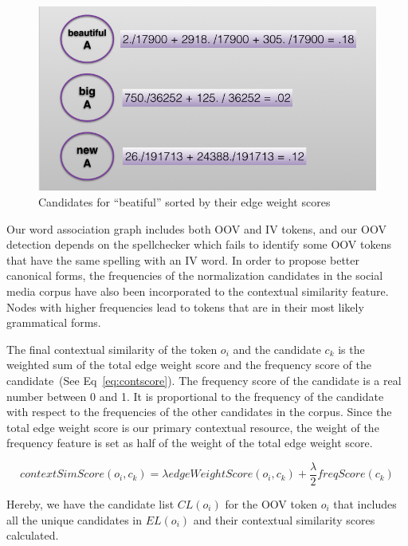\documentclass[a4paper,onesided,12pt]{report}
\begin{document}
\begin{figure}[htb]
\begin{center}
\includegraphics[scale=0.5]{fig/contextScores}
\caption{Candidates for ``beatiful'' sorted by their edge weight scores}
\label{fig:contextscores}
\end{center}
\end{figure}

Our word association graph includes both OOV and IV tokens, and our OOV detection depends on the spellchecker which fails to identify some OOV tokens that have the same spelling with an IV word. In order to propose better canonical forms, the frequencies of the normalization candidates in the social media corpus have also been incorporated to the contextual similarity feature. Nodes with higher frequencies lead to tokens that are in their most likely grammatical forms.

The final contextual similarity of the token $o_i$ and the candidate $c_k$ is the weighted sum of the total edge weight score and the frequency score of the candidate~(See Eq~\ref{eq:contscore}). The frequency score of the candidate is a real number between 0 and 1. It is proportional to the frequency of the candidate with respect to the frequencies of the other candidates in the corpus. Since the total edge weight score is our primary contextual resource, the weight of the frequency feature is set as half of the weight of the total edge weight score.

\begin{equation}
contextSimScore(o_i,c_k) = \lambda edgeWeightScore(o_i,c_k) + \frac{\lambda} 2 freqScore(c_k)
\label{eq:contscore}
\end{equation}

Hereby, we have the candidate list $CL(o_{i})$ for the OOV token $o_i$ that includes all the unique candidates in $EL(o_{i})$ and their contextual similarity scores calculated.
\end{document}
